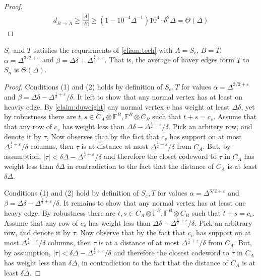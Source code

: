 \begin{proof}
   \begin{equation*}
     \begin{split}
       d_{B\rightarrow \bar{A}}  \ge \frac{|\bar{A}|}{|B|} \ge \left( 1 - 10^{-4}\Delta^{-1}  \right) 10^{4} \cdot \delta^{2}\Delta  = \Theta\left( \Delta \right)
     \end{split}
   \end{equation*}
 \end{proof}
 
 \begin{claim}
   \label{claim:satis}
   $S_{e}$ and $T$ satisfies the requrirments of \cref{cliam:tech} with $A = S_{e}$, $B = T$, $\alpha = \Delta^{3/2 + \varepsilon}$ and $\beta = \Delta\delta + \Delta^{\frac{1}{2} + \varepsilon}$. That is, the average of havey edges form $T$ to $S_{n}$ is $\Theta\left( \Delta \right)$. 
 \end{claim}

 \begin{proof}
   Conditions (1) and (2) holds by definition of $S_{e},T$ for values $\alpha = \Delta^{3/2 + \varepsilon}$ and $\beta = \Delta\delta - \Delta^{\frac{1}{2}+\varepsilon}/\delta$. It left to show that any normal vertex has at least on heaviy edge. By \cref{claim:duweight} any normal vertex $v$ has weight at least $\Delta\delta$, yet by robustness there are $t,s \in C_{A}\otimes \mathbb{F}^{B}, \mathbb{F}^{B}\otimes  C_{B}$ such that $t+s = c_{v}$. Assume that that any row of $c_{v}$ has weight less than $\Delta\delta - \Delta^{\frac{1}{2}+\varepsilon}/\delta$. Pick an arbitery row, and denote it by $\tau$, Now observes that by the fact that $c_{v}$ has support on at most $\Delta^{\frac{1}{2}+\varepsilon}/\delta$ columns, then $\tau$ is at distance at most $\Delta^{\frac{1}{2}+\varepsilon}/\delta$ from $C_{A}$. But, by assumption, $|\tau| < \delta\Delta -\Delta^{\frac{1}{2}+\varepsilon}/\delta$ and therefore the closet codeword to $\tau$ in $C_{A}$ has weight less than  $\delta\Delta$ in contradiction to the fact that the distance of $C_{A}$ is at least $\delta\Delta$.  

Conditions (1) and (2) hold by definition of $S_e,T$ for values $\alpha = \Delta^{3/2 + \varepsilon}$ and $\beta = \Delta\delta - \Delta^{\frac{1}{2}+\varepsilon}/\delta$. It remains to show that any normal vertex has at least one heavy edge. By robustness there are $t,s \in C_{A}\otimes \mathbb{F}^{B}, \mathbb{F}^{B}\otimes  C_{B}$ such that $t+s = c_{v}$. Assume that any row of $c_{v}$ has weight less than $\Delta\delta - \Delta^{\frac{1}{2}+\varepsilon}/\delta$. Pick an arbitrary row, and denote it by $\tau$. Now observe that by the fact that $c_{v}$ has support on at most $\Delta^{\frac{1}{2}+\varepsilon}/\delta$ columns, then $\tau$ is at a distance of at most $\Delta^{\frac{1}{2}+\varepsilon}/\delta$ from $C_{A}$. But, by assumption, $|\tau| < \delta\Delta -\Delta^{\frac{1}{2}+\varepsilon}/\delta$ and therefore the closest codeword to $\tau$ in $C_{A}$ has weight less than $\delta\Delta$, in contradiction to the fact that the distance of $C_{A}$ is at least $\delta\Delta$.
 \end{proof}

